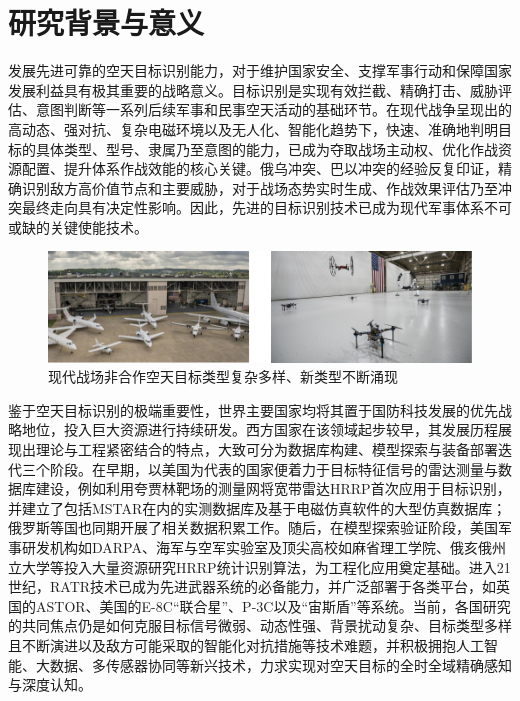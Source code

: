 \section{研究背景与意义}
\label{sec:background_significance} %
发展先进可靠的空天目标识别能力，对于维护国家安全、支撑军事行动和保障国家发展利益具有极其重要的战略意义。目标识别是实现有效拦截、精确打击、威胁评估、意图判断等一系列后续军事和民事空天活动的基础环节。在现代战争呈现出的高动态、强对抗、复杂电磁环境以及无人化、智能化趋势下，快速、准确地判明目标的具体类型、型号、隶属乃至意图的能力，已成为夺取战场主动权、优化作战资源配置、提升体系作战效能的核心关键。俄乌冲突、巴以冲突的经验反复印证，精确识别敌方高价值节点和主要威胁，对于战场态势实时生成、作战效果评估乃至冲突最终走向具有决定性影响。因此，先进的目标识别技术已成为现代军事体系不可或缺的关键使能技术。

\begin{figure}[h!]
    \centering
    \includegraphics[width=\linewidth]{figures/kongzhong.pdf}
    \caption{现代战场非合作空天目标类型复杂多样、新类型不断涌现}
    \label{fig:hrrp_generation}
\end{figure}

鉴于空天目标识别的极端重要性，世界主要国家均将其置于国防科技发展的优先战略地位，投入巨大资源进行持续研发。西方国家在该领域起步较早，其发展历程展现出理论与工程紧密结合的特点，大致可分为数据库构建、模型探索与装备部署迭代三个阶段。在早期，以美国为代表的国家便着力于目标特征信号的雷达测量与数据库建设，例如利用夸贾林靶场的测量网将宽带雷达HRRP首次应用于目标识别，并建立了包括MSTAR在内的实测数据库及基于电磁仿真软件的大型仿真数据库；俄罗斯等国也同期开展了相关数据积累工作。随后，在模型探索验证阶段，美国军事研发机构如DARPA、海军与空军实验室及顶尖高校如麻省理工学院、俄亥俄州立大学等投入大量资源研究HRRP统计识别算法，为工程化应用奠定基础。进入21世纪，RATR技术已成为先进武器系统的必备能力，并广泛部署于各类平台，如英国的ASTOR、美国的E-8C“联合星”、P-3C以及“宙斯盾”等系统。当前，各国研究的共同焦点仍是如何克服目标信号微弱、动态性强、背景扰动复杂、目标类型多样且不断演进以及敌方可能采取的智能化对抗措施等技术难题，并积极拥抱人工智能、大数据、多传感器协同等新兴技术，力求实现对空天目标的全时全域精确感知与深度认知。


